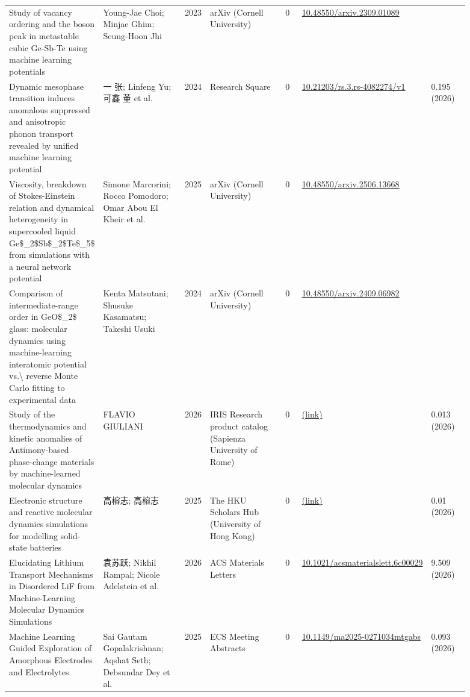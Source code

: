 \documentclass[10pt,a4paper]{article}
\begin{document}
{\begin{longtable}{p{0.192\linewidth}p{0.192\linewidth}p{0.043\linewidth}p{0.192\linewidth}p{0.043\linewidth}p{0.132\linewidth}p{0.096\linewidth}}
Study of vacancy ordering and the boson peak in metastable cubic Ge-Sb-Te using machine learning potentials & Young-Jae Choi; Minjae Ghim; Seung-Hoon Jhi & 2023 & arXiv (Cornell University) & 0 & \href{https://doi.org/10.48550/arxiv.2309.01089}{10.48550/arxiv.2309.01089} &  \\
Dynamic mesophase transition induces anomalous suppressed and anisotropic phonon transport revealed by unified machine learning potential & 一 张; Linfeng Yu; 可鑫 董 et al. & 2024 & Research Square & 0 & \href{https://doi.org/10.21203/rs.3.rs-4082274/v1}{10.21203/rs.3.rs-4082274/v1} & 0.195 (2026) \\
Viscosity, breakdown of Stokes-Einstein relation and dynamical heterogeneity in supercooled liquid Ge\$\_2\$Sb\$\_2\$Te\$\_5\$ from simulations with a neural network potential & Simone Marcorini; Rocco Pomodoro; Omar Abou El Kheir et al. & 2025 & arXiv (Cornell University) & 0 & \href{https://doi.org/10.48550/arxiv.2506.13668}{10.48550/arxiv.2506.13668} &  \\
Comparison of intermediate-range order in GeO\$\_2\$ glass: molecular dynamics using machine-learning interatomic potential vs.\textbackslash{} reverse Monte Carlo fitting to experimental data & Kenta Matsutani; Shusuke Kasamatsu; Takeshi Usuki & 2024 & arXiv (Cornell University) & 0 & \href{https://doi.org/10.48550/arxiv.2409.06982}{10.48550/arxiv.2409.06982} &  \\
Study of the thermodynamics and kinetic anomalies of Antimony-based phase-change materials by machine-learned molecular dynamics & FLAVIO GIULIANI & 2026 & IRIS Research product catalog (Sapienza University of Rome) & 0 & \href{https://openalex.org/W7130263246}{(link)} & 0.013 (2026) \\
Electronic structure and reactive molecular dynamics simulations for modelling solid-state batteries & 高榕志; 高榕志 & 2025 & The HKU Scholars Hub (University of Hong Kong) & 0 & \href{https://openalex.org/W7119437731}{(link)} & 0.01 (2026) \\
Elucidating Lithium Transport Mechanisms in Disordered LiF from Machine-Learning Molecular Dynamics Simulations & 袁苏跃; Nikhil Rampal; Nicole Adelstein et al. & 2026 & ACS Materials Letters & 0 & \href{https://doi.org/10.1021/acsmaterialslett.6c00029}{10.1021/acsmaterialslett.6c00029} & 9.509 (2026) \\
Machine Learning Guided Exploration of Amorphous Electrodes and Electrolytes & Sai Gautam Gopalakrishnan; Aqshat Seth; Debsundar Dey et al. & 2025 & ECS Meeting Abstracts & 0 & \href{https://doi.org/10.1149/ma2025-0271034mtgabs}{10.1149/ma2025-0271034mtgabs} & 0.093 (2026) \\

\end{longtable}}
\end{document}

